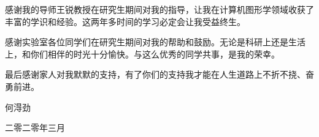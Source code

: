 \begin{thanks}

感谢我的导师王锐教授在研究生期间对我的指导，让我在计算机图形学领域收获了丰富的学识和经验。这两年多时间的学习必定会让我受益终生。

感谢实验室各位同学们在研究生期间对我的帮助和鼓励。无论是科研上还是生活上，和你们相伴的时光十分愉快。与这么优秀的同学共事，是我的荣幸。

最后感谢家人对我默默的支持，有了你们的支持我才能在人生道路上不折不挠、奋勇前进。

\begin{flushright}
{
  \large{何淂劲}\hspace{0.5in}

  \large{二零二零年三月}\hspace{0.18in}
}

\end{flushright}

\end{thanks}
